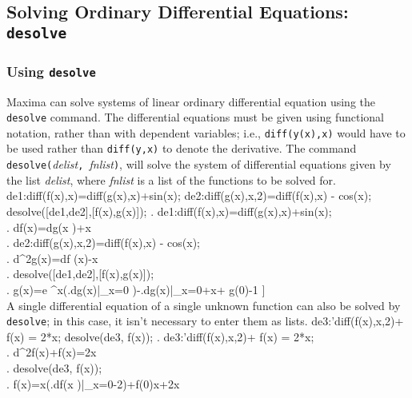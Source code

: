 \documentclass{article}
\begin{document}
\subsection{Solving Ordinary Differential Equations: \texttt{desolve}}
\label{subsec:desolve}

\subsubsection{Using \texttt{desolve}}

Maxima can solve systems of linear ordinary differential equation
using the  \texttt{desolve} command. The differential
equations must be given using functional notation, rather than with
dependent variables; i.e., \texttt{diff(y(x),x)} would have to be used
rather than \texttt{diff(y,x)} to denote the derivative.  
The command 
\texttt{desolve(}\textit{delist}\texttt{, }\textit{fnlist}\texttt{)},
will solve the system of differential equations given by the list
\textit{delist}, where \textit{fnlist} is a list of the functions to
be solved for.
\beginmaximasession
de1:diff(f(x),x)=diff(g(x),x)+sin(x);
de2:diff(g(x),x,2)=diff(f(x),x) - cos(x);
desolve([de1,de2],[f(x),g(x)]);
\maximatexsession
{}.  de1:diff(f(x),x)=diff(g(x),x)+sin(x); \\
.   {{d}}\*f\left(x\right)={{d}}\*g\left(x
 \right)+\sin x \\
.  de2:diff(g(x),x,2)=diff(f(x),x) - cos(x); \\
.   {{d^{2}}}\*g\left(x\right)={{d}}\*f
 \left(x\right)-\cos x \\
.  desolve([de1,de2],[f(x),g(x)]); \\
.   \left[ f\left(x\right)=e^{x}\*\left(\left.{{d}\over{d\*x}}\*g
 \left(x\right)\right|_{x=0}\right)-\left.{{d}\over{d\*x}}\*g\left(x
 \right)\right|_{x=0}+f\left(0\right),\linebreak[0]g\left(x\right)=e
 ^{x}\*\left(\left.{{d}}\*g\left(x\right)\right|_{x=0}
 \right)-\left.{{d}}\*g\left(x\right)\right|_{x=0}+\cos x+
 g\left(0\right)-1 \right]  \\
\endmaximasession
\noindent
A single differential equation of a single unknown function can also
be solved by \texttt{desolve}; in this case, it isn't  
necessary to enter them as lists.
\beginmaximasession
de3:'diff(f(x),x,2)+ f(x) = 2*x;
desolve(de3, f(x));
\maximatexsession
{}.  de3:'diff(f(x),x,2)+ f(x) = 2*x; \\
.   {{d^{2}}}\*f\left(x\right)+f\left(x\right)=2\*x \\
.  desolve(de3, f(x)); \\
.   f\left(x\right)=\sin x\*\left(\left.{{d}}\*f\left(x
 \right)\right|_{x=0}-2\right)+f\left(0\right)\*\cos x+2\*x \\
\endmaximasession
\end{document}
